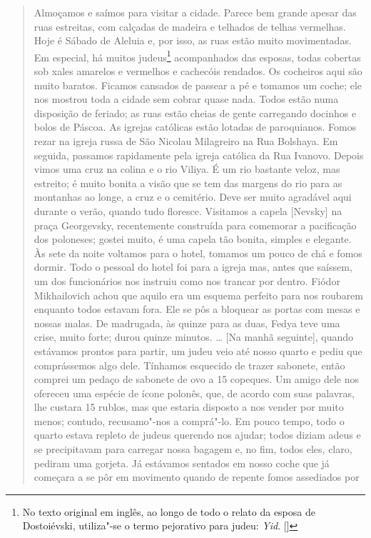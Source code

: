 \begin{quote}
Almoçamos e saímos para visitar a cidade. Parece bem grande apesar das
ruas estreitas, com calçadas de madeira e telhados de telhas vermelhas.
Hoje é Sábado de Aleluia e, por isso, as ruas estão muito movimentadas.
Em especial, há muitos judeus\footnote{No texto original em inglês, ao longo de todo o relato da esposa de Dostoiévski, utiliza"-se o termo pejorativo para judeu: \textit{Yid}. []} acompanhados das esposas, todas cobertas sob xales amarelos e vermelhos e cachecóis rendados. Os
cocheiros aqui são muito baratos. Ficamos cansados de passear a pé e
tomamos um coche; ele nos mostrou toda a cidade sem cobrar quase nada.
Todos estão numa disposição de feriado; as ruas estão cheias de gente
carregando docinhos e bolos de Páscoa. As igrejas católicas estão
lotadas de paroquianos. Fomos rezar na igreja russa de São Nicolau
Milagreiro na Rua Bolshaya. Em seguida, passamos rapidamente pela igreja
católica da Rua Ivanovo. Depois vimos uma cruz na colina e o rio Viliya.
É um rio bastante veloz, mas estreito; é muito bonita a visão que se tem
das margens do rio para as montanhas ao longe, a cruz e o cemitério.
Deve ser muito agradável aqui durante o verão, quando tudo floresce.
Visitamos a capela {[}Nevsky{]} na praça Georgevsky, recentemente
construída para comemorar a pacificação dos poloneses; gostei muito, é
uma capela tão bonita, simples e elegante. Às sete da noite voltamos
para o hotel, tomamos um pouco de chá e fomos dormir. Todo o pessoal do
hotel foi para a igreja mas, antes que saíssem, um dos funcionários nos
instruiu como nos trancar por dentro. Fiódor Mikhailovich achou que
aquilo era um esquema perfeito para nos roubarem enquanto todos estavam
fora. Ele se pôs a bloquear as portas com mesas e nossas malas. De
madrugada, às quinze para as duas, Fedya teve uma crise, muito forte;
durou quinze minutos. \ldots{} {[}Na manhã seguinte{]}, quando estávamos
prontos para partir, um judeu veio até nosso quarto e pediu que
comprássemos algo dele. Tínhamos esquecido de trazer sabonete, então
comprei um pedaço de sabonete de ovo a 15 copeques. Um amigo dele nos
ofereceu uma espécie de ícone polonês, que, de acordo com suas palavras,
lhe custara 15 rublos, mas que estaria disposto a nos vender por muito
menos; contudo, recusamo"-nos a comprá"-lo. Em pouco tempo, todo o quarto
estava repleto de judeus querendo nos ajudar; todos diziam adeus e se
precipitavam para carregar nossa bagagem e, no fim, todos eles, claro,
pediram uma gorjeta. Já estávamos sentados em nosso coche que já
começara a se pôr em movimento quando de repente fomos assediados por

\end{quote}
